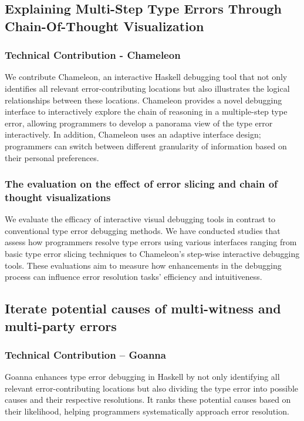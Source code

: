 \subsection{Explaining Multi-Step Type Errors Through Chain-Of-Thought Visualization}

\subsubsection{Technical Contribution - Chameleon}


We contribute Chameleon, an interactive Haskell debugging tool that not only identifies all relevant error-contributing locations but also illustrates the logical relationships between these locations. Chameleon provides a novel debugging interface to interactively explore the chain of reasoning in a multiple-step type error, allowing programmers to develop a panorama view of the type error interactively. In addition, Chameleon uses an adaptive interface design; programmers can switch between different granularity of information based on their personal preferences. 

\subsubsection{The evaluation on the effect of error slicing and chain of thought visualizations}
We evaluate the efficacy of interactive visual debugging tools in contrast to conventional type error debugging methods. We have conducted studies that assess how programmers resolve type errors using various interfaces ranging from basic type error slicing techniques to Chameleon's step-wise interactive debugging tools. These evaluations aim to measure how enhancements in the debugging process can influence error resolution tasks' efficiency and intuitiveness.

\subsection{Iterate potential causes of multi-witness and multi-party errors}

\subsubsection{Technical Contribution -- Goanna}
Goanna enhances type error debugging in Haskell by not only identifying all relevant error-contributing locations but also dividing the type error into possible causes and their respective resolutions. It ranks these potential causes based on their likelihood, helping programmers systematically approach error resolution.

